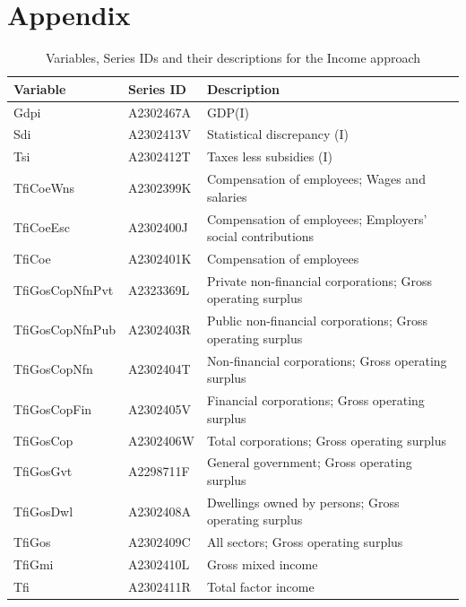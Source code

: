\documentclass[a4paper, 11pt]{article}
\begin{document}
\clearpage




\newpage
\printbibliography

\clearpage
\section*{Appendix}

\begin{table}[!h]
	\caption{Variables, Series IDs and their descriptions for the Income approach}
	\small
	\centering
	\begin{tabular*}{\columnwidth}[width = \textwidth]{lll}
		\toprule
		\textbf{Variable} & \textbf{Series ID} & \textbf{Description}\\
		\midrule
		Gdpi            & A2302467A & GDP(I)\\
		Sdi             & A2302413V & Statistical discrepancy (I)\\
		Tsi             & A2302412T & Taxes less subsidies (I)\\
		TfiCoeWns       & A2302399K & Compensation of employees; Wages and salaries\\
		TfiCoeEsc       & A2302400J & Compensation of employees; Employers' social contributions\\
		\addlinespace
		TfiCoe          & A2302401K & Compensation of employees\\
		TfiGosCopNfnPvt & A2323369L & Private non-financial corporations; Gross operating surplus\\
		TfiGosCopNfnPub & A2302403R & Public non-financial corporations; Gross operating surplus\\
		TfiGosCopNfn    & A2302404T & Non-financial corporations; Gross operating surplus\\
		TfiGosCopFin    & A2302405V & Financial corporations; Gross operating surplus\\
		\addlinespace
		TfiGosCop       & A2302406W & Total corporations; Gross operating surplus\\
		TfiGosGvt       & A2298711F & General government; Gross operating surplus\\
		TfiGosDwl       & A2302408A & Dwellings owned by persons; Gross operating surplus\\
		TfiGos          & A2302409C & All sectors; Gross operating surplus\\
		TfiGmi          & A2302410L & Gross mixed income\\
		Tfi             & A2302411R & Total factor income\\
		\bottomrule
	\end{tabular*}
	\label{Tab: Income-hierarchy}
\end{table}
\end{document}
